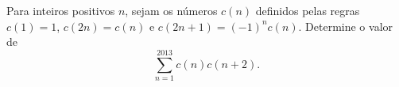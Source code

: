 Para inteiros positivos \(n\), sejam os números \(c(n)\) definidos pelas regras \(c(1) = 1\), \(c(2n) = c(n)\) e \(c(2n+1) = (-1)^nc(n)\).
Determine o valor de \[\sum_{n=1}^{2013}c(n)c(n+2).\]
